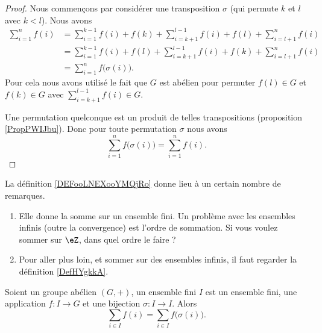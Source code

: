 \begin{proof}
    Nous commençons par considérer une transposition \( \sigma\) (qui permute \( k\) et \( l\) avec \( k<l\)). Nous avons
    \begin{subequations}
        \begin{align}
            \sum_{i=1}^nf(i)&=\sum_{i=1}^{k-1}f(i)+f(k)+\sum_{i=k+1}^{l-1}f(i)+f(l)+\sum_{i=l+1}^nf(i)\\
            &=\sum_{i=1}^{k-1}f(i)+f(l)+\sum_{i=k+1}^{l-1}f(i)+f(k)+\sum_{i=l+1}^nf(i)\\
            &=\sum_{i=1}^nf\big( \sigma(i) \big).
        \end{align}
    \end{subequations}
    Pour cela nous avons utilisé le fait que \( G\) est abélien pour permuter \( f(l)\in G\) et \( f(k)\in G\) avec \( \sum_{i=k+1}^{l-1}f(i)\in G\).

    Une permutation quelconque est un produit de telles transpositions (proposition \ref{PropPWIJbu}). Donc pour toute permutation \( \sigma\) nous avons
    \begin{equation}
        \sum_{i=1}^nf\big( \sigma(i) \big)=\sum_{i=1}^nf(i).
    \end{equation}
\end{proof}

La définition \ref{DEFooLNEXooYMQjRo} donne lieu à un certain nombre de remarques.
\begin{enumerate}
    \item
        Elle donne la somme sur un ensemble fini. Un problème avec les ensembles infinis (outre la convergence) est l'ordre de sommation. Si vous voulez sommer sur \( \eZ\), dans quel ordre le faire ?
    \item
        Pour aller plus loin, et sommer sur des ensembles infinis, il faut regarder la définition \ref{DefHYgkkA}. 
\end{enumerate}

\begin{proposition}     \label{PROPooJBQVooNqWErk}
    Soient un groupe abélien \( (G,+)\), un ensemble fini \( I\) est un ensemble fini, une application \( f\colon I\to G\) et une bijection \( \sigma\colon I\to I\). Alors
    \begin{equation}
        \sum_{i\in I}f(i)=\sum_{i\in I}f\big( \sigma(i) \big).
    \end{equation}
\end{proposition}

